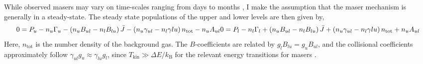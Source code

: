 While observed masers may vary on time-scales ranging from days to months \citep[e.g.,]{Elitzur_1992}, I make the assumption that the maser mechanism is generally in a steady-state. The steady state populations of the upper and lower levels are then given by,
\begin{equation}
\label{eq:ss_pops}
0 = P_u - n_u \Gamma_u - \left( n_u B_{ul} - n_l B_{lu} \right)\bar{J} - \left( n_u \gamma_{ul} - n_l \gamma{lu} \right) n_{\mathrm{tot}} - n_u A_{ul} \\
0 = P_l - n_l \Gamma_l + \left( n_u B_{ul} - n_l B_{lu} \right)\bar{J} + \left( n_u \gamma_{ul} - n_l \gamma{lu} \right) n_{\mathrm{tot}} + n_u A_{ul}
\end{equation}
Here, $n_{\mathrm{tot}}$ is the number density of the background gas. The $B$-coefficients are related by $g_lB_{lu}=g_uB_{ul}$, and the collisional coefficients approximately follow $\gamma_{ul}g_u \approx \gamma_{lu}g_l$, since $T_{\mathrm{kin}} \gg \Delta E / k_{\mathrm{B}}$ for the relevant energy transitions for masers \citep{stahler_palla_2004}.

